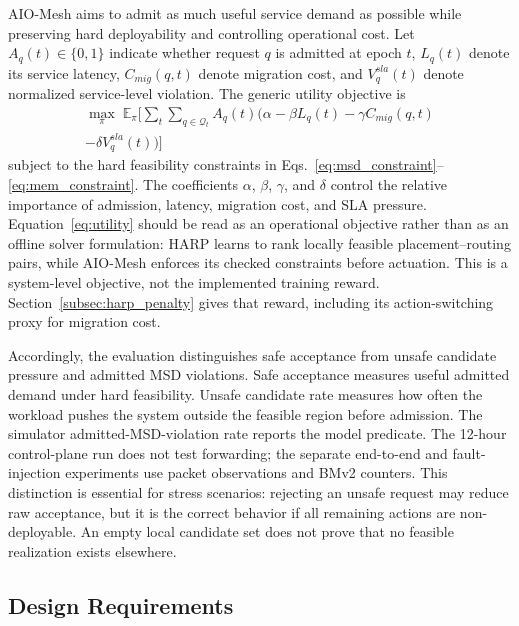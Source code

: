 \documentclass[final,5p]{elsarticle}
\newcommand{\rev}[1]{\textcolor{revisiongreen}{#1}}
\let\newrev\rev
\begin{document}
AIO-Mesh aims to admit as much useful service demand as possible while preserving hard deployability and controlling operational cost. Let \(A_q(t)\in\{0,1\}\) indicate whether request \(q\) is admitted at epoch \(t\), \(L_q(t)\) denote its service latency, \(C_{mig}(q,t)\) denote migration cost, and \(V_q^{sla}(t)\) denote normalized service-level violation. The generic utility objective is
\begin{equation}
\begin{aligned}
\max_{\pi} \;
\mathbb{E}_{\pi} \Bigg[
\sum_{t} \sum_{q \in \mathcal{Q}_t}
A_q(t) \Big(
\alpha - \beta L_q(t) - \gamma C_{mig}(q,t) \\
- \delta V_q^{sla}(t)
\Big)
\Bigg]
\end{aligned}
\label{eq:utility}
\end{equation}
subject to the hard feasibility constraints in
Eqs.~\eqref{eq:msd_constraint}--\eqref{eq:mem_constraint}. The coefficients \(\alpha\), \(\beta\), \(\gamma\), and \(\delta\) control the relative importance of admission, latency, migration cost, and SLA pressure. Equation~\eqref{eq:utility} should be read as an operational objective rather than as an offline solver formulation: HARP learns to rank \newrev{locally feasible placement--routing pairs}, while AIO-Mesh enforces \newrev{its checked constraints} before actuation. \newrev{This is a system-level objective, not the implemented training reward. Section~\ref{subsec:harp_penalty} gives that reward, including its action-switching proxy for migration cost.}

Accordingly, the evaluation distinguishes safe acceptance from unsafe candidate pressure and admitted MSD violations. Safe acceptance measures useful admitted demand under hard feasibility. Unsafe candidate rate measures how often the workload pushes the system outside the feasible region before admission. \newrev{The simulator admitted-MSD-violation rate reports the model predicate. The 12-hour control-plane run does not test forwarding; the separate end-to-end and fault-injection experiments use packet observations and BMv2 counters.} This distinction is essential for stress scenarios: rejecting an unsafe request may reduce raw acceptance, but it is the correct behavior if all remaining actions are non-deployable. \rev{An empty local candidate set does not prove that no feasible realization exists elsewhere.}

\subsection{Design Requirements}
\label{subsec:design_requirements}
\end{document}
